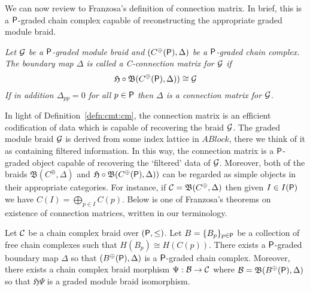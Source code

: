 We can now review to Franzosa's definition of connection matrix.  In brief, this is a ${\mathsf P}$-graded chain complex capable of reconstructing the appropriate graded module braid.

\begin{defn}\label{defn:cmt:cm}
{\em
Let ${\mathcal G}$ be a ${\mathsf P}$-graded module braid and $(C^\oplus({\mathsf P}),\Delta)$ be a ${\mathsf P}$-graded chain complex.  The boundary map $\Delta$ is called a {\em C-connection matrix for} ${\mathcal G}$ if $$\mathfrak{H}\circ \mathfrak{B}(C^\oplus({\mathsf P}),\Delta))\cong {\mathcal G}$$  If in addition $\Delta_{pp}=0$ for all $p\in {\mathsf P}$ then $\Delta$ is a {\em connection matrix for} ${\mathcal G}$.
}
\end{defn}


  In light of Definition~\ref{defn:cmt:cm}, the connection matrix is an efficient codification of data which is capable of recovering the braid ${\mathcal G}$.  The graded module braid ${\mathcal G}$ is derived from some index lattice in $ABlock$, there we think of it as containing filtered information.  In this way, the connection matrix is a ${\mathsf P}$-graded object capable of recovering the `filtered' data of ${\mathcal G}$.  Moreover, both of the braids $\mathfrak{B}(C^\oplus,\Delta)$ and $\mathfrak{H}\circ \mathfrak{B}(C^\oplus({\mathsf P}),\Delta))$ can be regarded as simple objects in their appropriate categories.  For instance, if ${\mathcal C} = \mathfrak{B}(C^\oplus,\Delta)$ then given $I\in I({\mathsf P})$ we have $C(I) = \bigoplus_{p\in I} C(p)$.  Below is one of Franzosa's theorems on existence of connection matrices, written in our terminology.

\begin{thm}
Let ${\mathcal C}$ be a chain complex braid over $({\mathsf P},\leq)$.  Let $B=\{B_p\}_{p\in {\mathsf P}}$ be a collection of free chain complexes such that $H(B_p) \cong H(C(p))$.  There exists a ${\mathsf P}$-graded boundary map $\Delta$ so that  $(B^\oplus({\mathsf P}),\Delta)$ is a ${\mathsf P}$-graded chain complex.  Moreover, there exists a chain complex braid morphism $\Psi:{\mathcal B}  \to {\mathcal C}$ where ${\mathcal B}= \mathfrak{B}(B^\oplus({\mathsf P}),\Delta)$ so that $\mathfrak{H}\Psi$ is a graded module braid isomorphism.
\end{thm}

